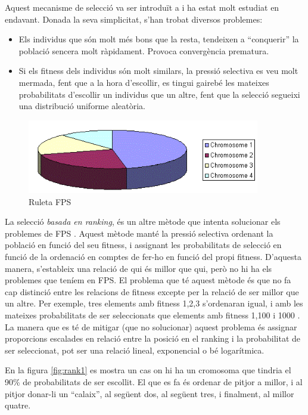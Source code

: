Aquest mecanisme de selecció va ser introduït a \cite{H75} i ha estat molt
estudiat en endavant.  Donada la seva simplicitat, s'han trobat diversos
problemes:

\begin{itemize}
	\item Els individus que són molt més bons que la resta, tendeixen a
	``conquerir'' la població sencera molt ràpidament. Provoca convergència
	prematura.
	\item Si els fitness dels individus són molt similars, la pressió selectiva
	es veu molt mermada, fent que a la hora d'escollir, es tingui gairebé les
	mateixes probabilitats d'escollir un individus que un altre, fent que la
	selecció segueixi una distribució uniforme aleatòria.
\end{itemize}


\begin{figure} \centering \includegraphics[width=4in]{intro/rwsgraph.png}
\caption{\label{fig:rwsgraph}Ruleta FPS}
\end{figure}

La selecció \emph{basada en ranking}, és un altre mètode que intenta
solucionar els problemes de FPS \cite{B87a}.  Aquest mètode manté la pressió
selectiva ordenant la població en funció del seu fitness, i assignant les
probabilitats de selecció en funció de la ordenació en comptes de fer-ho en
funció del propi fitness. D'aquesta manera, s'estableix una relació de qui és
millor que qui, però no hi ha els problemes que teníem en FPS.  El problema que
té aquest mètode és que no fa cap distinció entre les relacions de fitness
excepte per la relació de ser millor que un altre.  Per exemple, tres elements
amb fitness 1,2,3 s'ordenaran igual, i amb les mateixes probabilitats de ser
seleccionats que elements amb fitness 1,100 i 1000 .  La manera que es té de
mitigar (que no solucionar) aquest problema és assignar proporcions escalades en
relació entre la posició en el ranking i la probabilitat de ser seleccionat,
pot ser una relació lineal, exponencial o bé logarítmica. 

En la figura \ref{fig:rank1} es mostra  un cas on hi ha un cromosoma que tindria
el 90\% de probabilitats de ser escollit. El que es fa és ordenar de pitjor a
millor, i al pitjor donar-li un ``calaix'', al següent dos, al següent tres, i
finalment, al millor quatre. 

